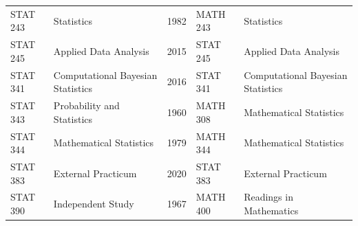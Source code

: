 \documentclass[
]{book}
\begin{document}
\begin{table}
\begin{tabular}[t]{llrll}
STAT 243 & Statistics & 1982 & MATH 243 & Statistics\\
STAT 245 & Applied Data Analysis & 2015 & STAT 245 & Applied Data Analysis\\
STAT 341 & Computational Bayesian Statistics & 2016 & STAT 341 & Computational Bayesian Statistics\\
\addlinespace
STAT 343 & Probability and Statistics & 1960 & MATH 308 & Mathematical Statistics\\
STAT 344 & Mathematical Statistics & 1979 & MATH 344 & Mathematical Statistics\\
STAT 383 & External Practicum & 2020 & STAT 383 & External Practicum\\
STAT 390 & Independent Study & 1967 & MATH 400 & Readings in Mathematics\\
\bottomrule
\end{tabular}
\end{table}

  
\end{document}
